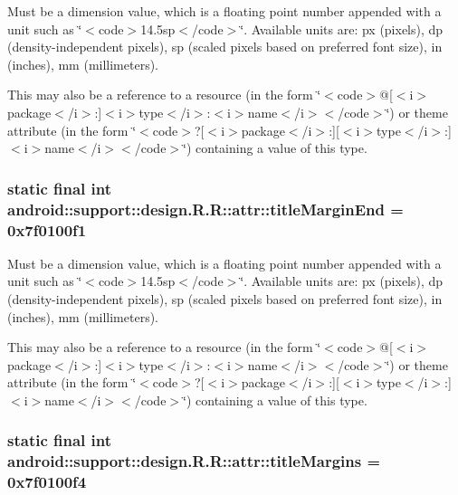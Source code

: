 Must be a dimension value, which is a floating point number appended with a unit such as \char`\"{}$<$code$>$14.5sp$<$/code$>$\char`\"{}. Available units are: px (pixels), dp (density-independent pixels), sp (scaled pixels based on preferred font size), in (inches), mm (millimeters). 

This may also be a reference to a resource (in the form \char`\"{}$<$code$>$@\mbox{[}$<$i$>$package$<$/i$>$:\mbox{]}$<$i$>$type$<$/i$>$:$<$i$>$name$<$/i$>$$<$/code$>$\char`\"{}) or theme attribute (in the form \char`\"{}$<$code$>$?\mbox{[}$<$i$>$package$<$/i$>$:\mbox{]}\mbox{[}$<$i$>$type$<$/i$>$:\mbox{]}$<$i$>$name$<$/i$>$$<$/code$>$\char`\"{}) containing a value of this type. \hypertarget{classandroid_1_1support_1_1design_1_1_r_1_1attr_2d050bece904a53c07e83e4dab68e96a}{
\subsubsection[{titleMarginEnd}]{\setlength{\rightskip}{0pt plus 5cm}static final int android::support::design.R.R::attr::titleMarginEnd = 0x7f0100f1}}
\label{classandroid_1_1support_1_1design_1_1_r_1_1attr_2d050bece904a53c07e83e4dab68e96a}


Must be a dimension value, which is a floating point number appended with a unit such as \char`\"{}$<$code$>$14.5sp$<$/code$>$\char`\"{}. Available units are: px (pixels), dp (density-independent pixels), sp (scaled pixels based on preferred font size), in (inches), mm (millimeters). 

This may also be a reference to a resource (in the form \char`\"{}$<$code$>$@\mbox{[}$<$i$>$package$<$/i$>$:\mbox{]}$<$i$>$type$<$/i$>$:$<$i$>$name$<$/i$>$$<$/code$>$\char`\"{}) or theme attribute (in the form \char`\"{}$<$code$>$?\mbox{[}$<$i$>$package$<$/i$>$:\mbox{]}\mbox{[}$<$i$>$type$<$/i$>$:\mbox{]}$<$i$>$name$<$/i$>$$<$/code$>$\char`\"{}) containing a value of this type. \hypertarget{classandroid_1_1support_1_1design_1_1_r_1_1attr_5d09a253f500eeb67f19ae8aa6b4ab44}{
\subsubsection[{titleMargins}]{\setlength{\rightskip}{0pt plus 5cm}static final int android::support::design.R.R::attr::titleMargins = 0x7f0100f4}}
\label{classandroid_1_1support_1_1design_1_1_r_1_1attr_5d09a253f500eeb67f19ae8aa6b4ab44}


